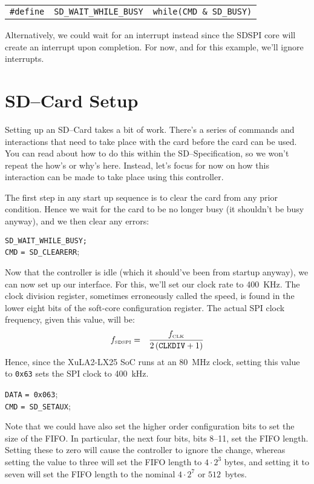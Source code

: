 \documentclass{gqtekspec}
\begin{document}
\begin{tabular}{lll}
{\tt \#define} & {\tt SD\_WAIT\_WHILE\_BUSY}&{\tt while(CMD \& SD\_BUSY)}
\end{tabular}

Alternatively, we could wait for an interrupt instead since the SDSPI core
will create an interrupt upon completion.  For now, and for this example,
we'll ignore interrupts.

\section{SD--Card Setup}
Setting up an SD--Card takes a bit of work.  There's a series of commands 
and interactions that need to take place with the card before the card can
be used.  You can read about how to do this within the SD--Specification, so
we won't repeat the how's or why's here.  Instead, let's focus for now on 
how this interaction can be made to take place using this controller.

The first step in any start up sequence is to clear the card from any
prior condition.  Hence we wait for the card to be no longer busy (it 
shouldn't be busy anyway), and we then clear any errors:
\begin{tabbing}
{\tt SD\_WAIT\_WHILE\_BUSY;} \\
{\tt CMD} \= {\tt = SD\_CLEARERR};
\end{tabbing}

Now that the controller is idle (which it should've been from startup anyway),
we can now set up our interface.  For this, we'll set our clock rate to 400~KHz.
The clock division register, sometimes erroneously called the speed, is found
in the lower eight bits of the soft-core configuration register.  The actual
SPI clock frequency, given this value, will be:
\begin{eqnarray}
f_{\mbox{\tiny SDSPI}} &=& \frac{f_{\mbox{\tiny CLK}}}{2\left(\mbox{\tt CLKDIV}+1\right)}
\end{eqnarray}
Hence, since the XuLA2-LX25 SoC runs at an 80~MHz clock, setting this value to
{\tt 0x63} sets the SPI clock to 400~kHz.
\begin{tabbing}
{\tt DATA} \= {\tt = 0x063}; \\
{\tt CMD} \> {\tt = SD\_SETAUX};
\end{tabbing}
Note that we could have also set the higher order configuration bits to set
the size of the FIFO.  In particular, the next four bits, bits 8--11, set
the FIFO length.  Setting these to zero will cause the controller to ignore
the change, whereas setting the value to three will set the FIFO length to
$4\cdot2^3$ bytes, and setting it to seven will set the FIFO length to the
nominal $4\cdot 2^7$ or $512$~bytes.
\end{document}
